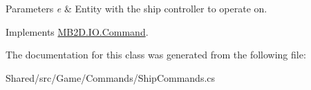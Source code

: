 \begin{DoxyParams}{Parameters}
{\em e} & Entity with the ship controller to operate on.\\
\hline
\end{DoxyParams}


Implements \hyperlink{class_m_b2_d_1_1_i_o_1_1_command_ae927e36c0e285848325cc68eddb5fd72}{M\+B2\+D.\+I\+O.\+Command}.



The documentation for this class was generated from the following file\+:\begin{DoxyCompactItemize}
\item 
Shared/src/\+Game/\+Commands/Ship\+Commands.\+cs\end{DoxyCompactItemize}

